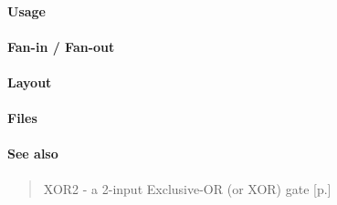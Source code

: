 \paragraph{Usage}

\paragraph{Fan-in / Fan-out}

\paragraph{Layout}

\paragraph{Files}

\paragraph{See also}
\begin{quote}
    XOR2 - a 2-input Exclusive-OR (or XOR) gate [p.\pageref{XOR2}]
\end{quote}
